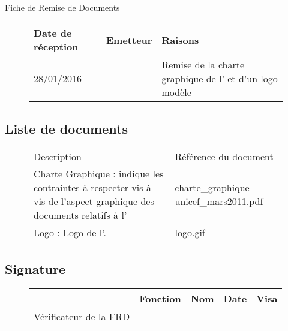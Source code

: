 \documentclass[asi, sansVersion]{picINSA}
\begin{document}
\begin{center}
\huge
\nomEquipe{}\\
Fiche de Remise de Documents\\
\end{center}
\vspace{0.5cm}


\begin{figure}[H]
		\centering
		\begin{tabularx}{17cm}{|p{4cm}|X|X|}
		\hline
		\rowcolor[gray]{0.85}Date de réception & Emetteur & Raisons \\
		\hline
		28/01/2016 & \nomClient{} & Remise de la charte graphique de l'\nomClient{} et d'un logo modèle\\
		\hline
		\end{tabularx}
\end{figure}

\subsection*{Liste de documents}

\begin{figure}[H]
		\centering
		\begin{tabularx}{17cm}{|p{7cm}|X|}
		\hline
		\rowcolor[gray]{0.85} Description & Référence du document \\
		Charte Graphique : indique les contraintes à respecter vis-à-vis de l'aspect graphique des documents relatifs à l'\Client{} & charte\_graphique-unicef\_mars2011.pdf \\
		\hline
		Logo \nomClient{} : Logo de l'\nomCmient. & logo.gif
		\end{tabularx}
\end{figure}

\subsection*{Signature}

\begin{figure}[H]
		\centering
		\begin{tabularx}{17cm}{|p{4cm}|X|X|X|X|}
		\hline
		\rowcolor[gray]{0.85}& Fonction & Nom & Date & Visa \\
		\hline
		 Vérificateur de la FRD & \RGC & \Mathieu &  &  \\
		\hline
		\end{tabularx}
\end{figure}
\end{document}
